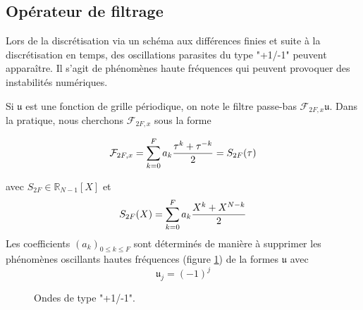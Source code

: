 \subsection{Opérateur de filtrage}


Lors de la discrétisation via un schéma aux différences finies et suite à la discrétisation en temps, des oscillations parasites du type "+1/-1" peuvent apparaître. Il s'agit de phénomènes haute fréquences qui peuvent provoquer des instabilités numériques. 

Si $\mathfrak{u}$ est une fonction de grille périodique, on note le filtre passe-bas $\mathcal{F}_{2F,x}\mathfrak{u}$. Dans la pratique, nous cherchons $\mathcal{F}_{2F,x}$ sous la forme 

\begin{equation}
\mathcal{F}_{2F,x} = \displaystyle\sum\limits_{k=0}^F a_k \dfrac{\tau^k + \tau^{-k}}{2} = S_{2F}(\tau)
\label{eq:ftr}
\end{equation}

avec $S_{2F} \in \mathbb{R}_{N-1}[X]$ et 
\begin{equation}
S_{2F}(X) = \displaystyle\sum\limits_{k=0}^F a_k \dfrac{X^k + X^{N-k}}{2}
\label{eq:pol_filtrage}
\end{equation}
Les coefficients $(a_k)_{0 \leq k \leq F}$ sont déterminés de manière à supprimer les phénomènes oscillants hautes fréquences (figure \ref{fig:hf_waves}) de la formes $\mathfrak{u}$ avec 
\begin{equation}
\mathfrak{u}_j = (-1)^j
\end{equation}

\begin{figure}[htbp]
\begin{center}
\end{center}
\caption{Ondes de type "+1/-1".}
\label{fig:hf_waves}
\end{figure}


